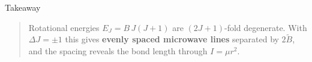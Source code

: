 \documentclass[
  ignorenonframetext,
  aspectratio=169,
  handout]{beamer}
\begin{document}
\begin{frame}{Takeaway}
\protect{}\label{takeaway}
\begin{quote}
Rotational energies \(E_J = B\,J(J+1)\) are \((2J+1)\)-fold degenerate.
With \(\Delta J=\pm 1\) this gives \textbf{evenly spaced microwave
lines} separated by \(2\tilde{B}\), and the spacing reveals the bond
length through \(I=\mu r^2\).
\end{quote}
\end{frame}
\end{document}
